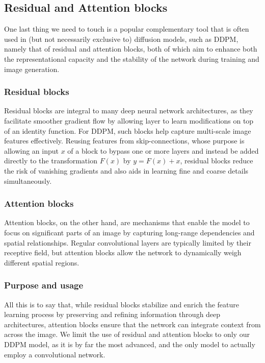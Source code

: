 \documentclass{article}
\begin{document}
\subsection{Residual and Attention blocks}
One last thing we need to touch is a popular complementary tool that is often used in (but not necessarily exclusive to) diffusion models, such as DDPM, namely that of residual and attention blocks, both of which aim to enhance both the representational capacity and the stability of the network during training and image generation. \newline
\subsubsection{Residual blocks}
Residual blocks are integral to many deep neural network architectures, as they facilitate smoother gradient flow by allowing layer to learn modifications on top of an identity function. For DDPM, such blocks help capture multi-scale image features effectively. Reusing features from skip-connections, whose purpose is allowing an input $x$ of a block to bypass one or more layers and instead be added directly to the transformation $F(x)$ by $y = F(x) + x$, residual blocks reduce the risk of vanishing gradients and also aids in learning fine and coarse details simultaneously.
\subsubsection{Attention blocks}
Attention blocks, on the other hand, are mechanisms that enable the model to focus on significant parts of an image by capturing long-range dependencies and spatial relationships. Regular convolutional layers are typically limited by their receptive field, but attention blocks allow the network to dynamically weigh different spatial regions.
\subsubsection{Purpose and usage}
All this is to say that, while residual blocks stabilize and enrich the feature learning process by preserving and refining information through deep architectures, attention blocks ensure that the network can integrate context from across the image. \newline
We limit the use of residual and attention blocks to only our DDPM model, as it is by far the most advanced, and the only model to actually employ a convolutional network.
\end{document}
